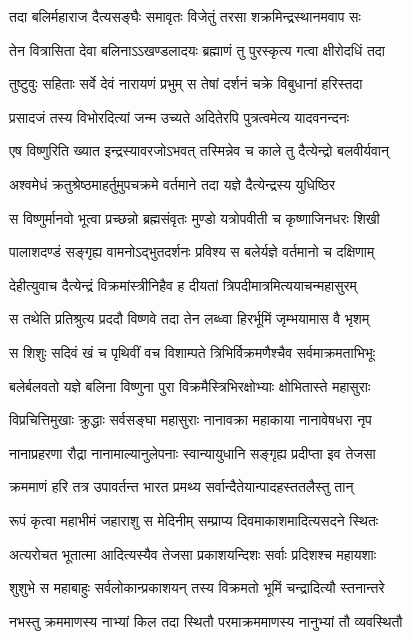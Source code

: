 \twolineshloka
{तदा बलिर्महाराज दैत्यसङ्घैः समावृतः}
{विजेतुं तरसा शक्रमिन्द्रस्थानमवाप सः}


\twolineshloka
{तेन वित्रासिता देवा बलिनाऽऽखण्डलादयः}
{ब्रह्माणं तु पुरस्कृत्य गत्वा क्षीरोदधिं तदा}


\twolineshloka
{तुष्टुवुः सहिताः सर्वे देवं नारायणं प्रभुम्}
{स तेषां दर्शनं चक्रे विबुधानां हरिस्तदा}


\twolineshloka
{प्रसादजं तस्य विभोरदित्यां जन्म उच्यते}
{अदितेरपि पुत्रत्वमेत्य यादवनन्दनः}


\twolineshloka
{एष विष्णुरिति ख्यात इन्द्रस्यावरजोऽभवत्}
{तस्मिन्नेव च काले तु दैत्येन्द्रो बलवीर्यवान्}


\twolineshloka
{अश्वमेधं क्रतुश्रेष्ठमाहर्तुमुपचक्रमे}
{वर्तमाने तदा यज्ञे दैत्येन्द्रस्य युधिष्ठिर}


\twolineshloka
{स विष्णुर्मानवो भूत्वा प्रच्छन्नो ब्रह्मसंवृतः}
{मुण्डो यत्रोपवीती च कृष्णाजिनधरः शिखी}


\twolineshloka
{पालाशदण्डं सङ्गृह्य वामनोऽद्भुतदर्शनः}
{प्रविश्य स बलेर्यज्ञे वर्तमानो च दक्षिणाम्}


\twolineshloka
{देहीत्युवाच दैत्येन्द्रं विक्रमांस्त्रीनिहैव ह}
{दीयतां त्रिपदीमात्रमित्ययाचन्महासुरम्}


\twolineshloka
{स तथेति प्रतिश्रुत्य प्रददौ विष्णवे तदा}
{तेन लब्ध्वा हिरर्भूमिं जृम्भयामास वै भृशम्}


\twolineshloka
{स शिशुः सदिवं खं च पृथिवीं वच विशाम्पते}
{त्रिभिर्विक्रमणैश्चैव सर्वमाक्रमताभिभूः}


\twolineshloka
{बलेर्बलवतो यज्ञे बलिना विष्णुना पुरा}
{विक्रमैस्त्रिभिरक्षोभ्याः क्षोभितास्ते महासुराः}


\twolineshloka
{विप्रचित्तिमुखाः क्रुद्धाः सर्वसङ्घा महासुराः}
{नानावक्रा महाकाया नानावेषधरा नृप}


\twolineshloka
{नानाप्रहरणा रौद्रा नानामाल्यानुलेपनाः}
{स्वान्यायुधानि सङ्गृह्य प्रदीप्ता इव तेजसा}


\twolineshloka
{क्रममाणं हरि तत्र उपावर्तन्त भारत}
{प्रमथ्य सर्वान्दैतेयान्पादहस्ततलैस्तु तान्}


\twolineshloka
{रूपं कृत्वा महाभीमं जहाराशु स मेदिनीम्}
{सम्प्राप्य दिवमाकाशमादित्यसदने स्थितः}


\twolineshloka
{अत्यरोचत भूतात्मा आदित्यस्यैव तेजसा}
{प्रकाशयन्दिशः सर्वाः प्रदिशश्च महायशाः}


\twolineshloka
{शुशुभे स महाबाहुः सर्वलोकान्प्रकाशयन्}
{तस्य विक्रमतो भूमिं चन्द्रादित्यौ स्तनान्तरे}


\twolineshloka
{नभस्तु क्रममाणस्य नाभ्यां किल तदा स्थितौ}
{परमाक्रममाणस्य नानुभ्यां तौ व्यवस्थितौ}


